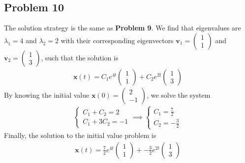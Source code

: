 \documentclass[12pt]{article}
\begin{document}
\subsection*{Problem 10}
\label{sec:orge67ce2f}
The solution strategy is the same as \textbf{Problem 9}. We find that eigenvalues are
\(\lambda_1 = 4\) and \(\lambda_2 = 2\) with their corresponding eigenvectors
\(\mathbf{v}_1 = \begin{pmatrix}1 \\ 1 \end{pmatrix}\) and
\(\mathbf{v}_2 = \begin{pmatrix}1 \\ 3 \end{pmatrix}\), such that the solution
is
\begin{align*}
        \mathbf{x}(t) = C_1 e^{4t} \begin{pmatrix}1 \\ 1 \end{pmatrix} +
        C_2 e^{2t} \begin{pmatrix}1 \\ 3 \end{pmatrix}
\end{align*}
By knowing the initial value
\(\mathbf{x}(0) = \begin{pmatrix} 2 \\ -1 \end{pmatrix}\), we solve the system
\begin{align*}
        \begin{cases}
                C_1 + C_2 = 2 \\
                C_1 + 3 C_2 = -1
        \end{cases}
        \implies
        \begin{cases}
                C_1 = \frac{7}{2} \\
                C_2 = -\frac{3}{2}
        \end{cases}
\end{align*}
Finally, the solution to the initial value problem is
\begin{align*}
        \mathbf{x}(t) = \frac{7}{2} e^{4t} \begin{pmatrix}1 \\ 1 \end{pmatrix} +
        - \frac{3}{2} e^{2t} \begin{pmatrix}1 \\ 3 \end{pmatrix}
\end{align*}
\end{document}
